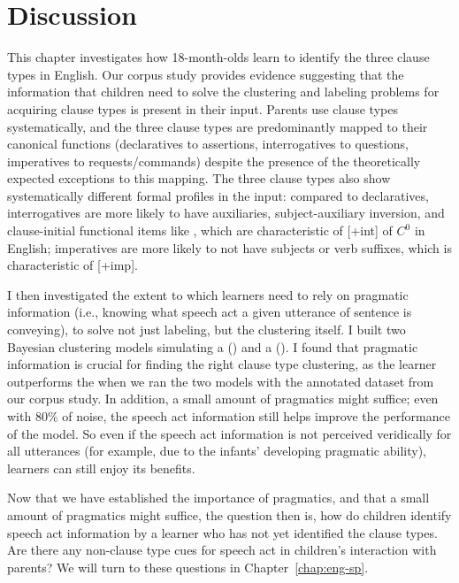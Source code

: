 \section{Discussion}
\label{sec:engcl:discussion}

This chapter investigates how 18-month-olds learn to identify the three clause types in English. Our corpus study provides evidence suggesting that the information that children need to solve the clustering and labeling problems for acquiring clause types is present in their input. Parents use clause types systematically, and the three clause types are predominantly mapped to their canonical functions (declaratives to assertions, interrogatives to questions, imperatives to requests/commands) despite the presence of the theoretically expected exceptions to this mapping. The three clause types also show systematically different formal profiles in the input: compared to declaratives, interrogatives are more likely to have auxiliaries, subject-auxiliary inversion, and clause-initial functional items like \twh{}, which are characteristic of [+int] of $C^{0}$ in English; imperatives are more likely to not have subjects or verb suffixes, which is characteristic of [+imp].


I then investigated the extent to which learners need to rely on pragmatic information (i.e., knowing what speech act a given utterance of sentence is conveying), to solve not just labeling, but the clustering itself. I built two Bayesian clustering models simulating a \distlearner{} (\dlearnerabbr{}) and a \praglearner{} (\plearnerabbr{}). I found that pragmatic information is crucial for finding the right clause type clustering, as the \plearnerabbr{} learner outperforms the \dlearnerabbr{} when we ran the two models with the annotated dataset from our corpus study. In addition, a small amount of pragmatics might suffice; even with 80\% of noise, the speech act information still helps improve the performance of the model. So even if the speech act information is not perceived veridically for all utterances (for example, due to the infants’ developing pragmatic ability), learners can still enjoy its benefits.

Now that we have established the importance of pragmatics, and that a small amount of pragmatics might suffice, the question then is, how do children identify speech act information by a learner who has not yet identified the clause types. Are there any non-clause type cues for speech act in children's interaction with parents? We will turn to these questions in Chapter~\ref{chap:eng-sp}.


